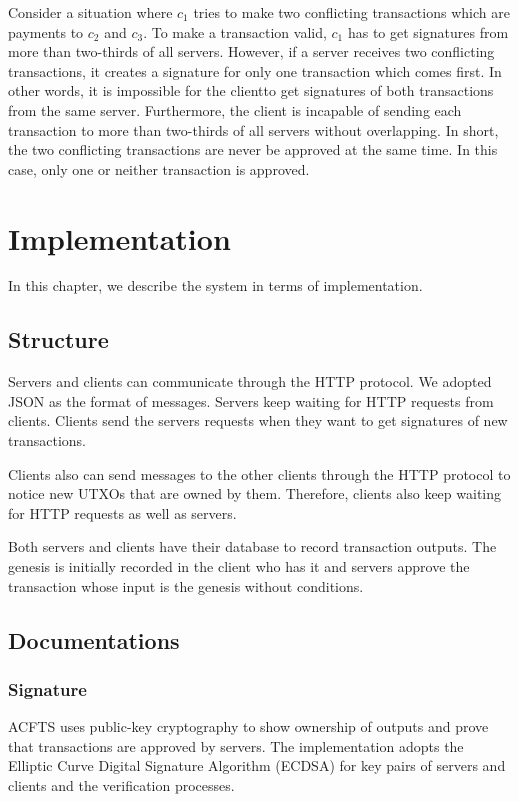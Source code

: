 \documentclass[a4paper, oneside]{discothesis}
\begin{document}
Consider a situation where $c_1$ tries to make two conflicting transactions
which are payments to $c_2$ and $c_3$.
To make a transaction valid,
$c_1$ has to get signatures from more than two-thirds of all servers.
However, if a server receives two conflicting transactions,
it creates a signature for only one transaction which comes first.
In other words, it is impossible for the clientto get signatures of both transactions
from the same server.
Furthermore, the client is incapable of sending each transaction
to more than two-thirds of all servers without overlapping.
In short, the two conflicting transactions are never be approved at the same time.
In this case, only one or neither transaction is approved.


\chapter{Implementation}
In this chapter, we describe the system in terms of implementation.

\section{Structure}
Servers and clients can communicate through the HTTP protocol.
We adopted JSON as the format of messages.
Servers keep waiting for HTTP requests from clients.
Clients send the servers requests when they want to get signatures of new transactions.

Clients also can send messages to the other clients through the HTTP protocol
to notice new UTXOs that are owned by them.
Therefore, clients also keep waiting for HTTP requests as well as servers.

Both servers and clients have their database to record transaction outputs.
The genesis is initially recorded in the client who has it
and servers approve the transaction whose input is the genesis without conditions.



\section{Documentations}

\subsection{Signature}
ACFTS uses public-key cryptography to show ownership of outputs
and prove that transactions are approved by servers.
The implementation adopts the Elliptic Curve Digital Signature Algorithm (ECDSA)
for key pairs of servers and clients and the verification processes.
\end{document}
